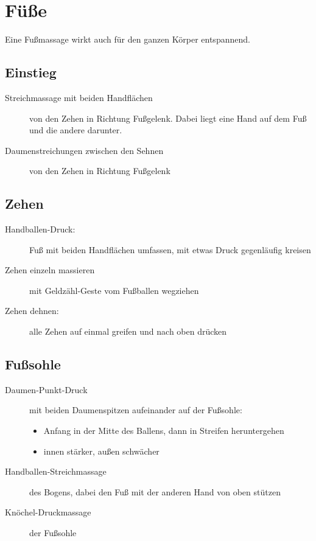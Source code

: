 \section{Füße}

Eine Fußmassage wirkt auch für den ganzen Körper entspannend.

\subsection{Einstieg}
\begin{description}
  \item[Streichmassage mit beiden Handflächen] von den Zehen in Richtung Fußgelenk. Dabei liegt eine Hand auf dem Fuß und die andere darunter.
  \item[Daumenstreichungen zwischen den Sehnen] von den Zehen in Richtung Fußgelenk
\end{description}

\subsection{Zehen}
\begin{description}
  \item[Handballen-Druck:] Fuß mit beiden Handflächen umfassen, mit etwas Druck gegenläufig kreisen
  \item[Zehen einzeln massieren] mit Geldzähl-Geste vom Fußballen wegziehen
  \item[Zehen dehnen:] alle Zehen auf einmal greifen und nach oben drücken
\end{description}

\subsection{Fußsohle}
\begin{description}
\item[Daumen-Punkt-Druck] mit beiden Daumenspitzen aufeinander auf der Fußsohle:
  \begin{itemize}
    \item Anfang in der Mitte des Ballens, dann in Streifen heruntergehen
    \item innen stärker, außen schwächer
  \end{itemize}
\item[Handballen-Streichmassage] des Bogens, dabei den Fuß mit der anderen Hand von oben stützen
\item[Knöchel-Druckmassage] der Fußsohle
\end{description}

